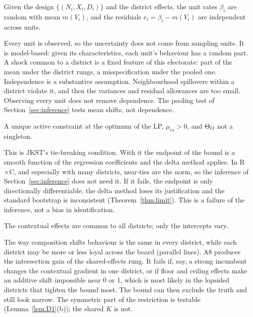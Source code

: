 \begin{assumption}\label{ass:A6}
Given the design $\{(N_i,X_i,D_i)\}$ and the district effects, the unit rates
$\beta_i$ are random with mean $m(V_i)$, and the residuals $e_i=\beta_i-m(V_i)$ are
independent across units.
\end{assumption}
\begin{reading}
Every unit is observed, so the uncertainty does not come from sampling units. It
is model-based: given its characteristics, each unit's behaviour has a random
part. A shock common to a district is a fixed feature of this electorate: part
of the mean under the district rungs, a misspecification under the pooled one.
Independence is a substantive assumption. Neighbourhood spillovers within a
district violate it, and then the variances and residual allowances are too
small. Observing every unit does not remove dependence. The pooling test of
Section~\ref{sec:inference} tests mean shifts, not dependence.
\end{reading}

\begin{assumption}\label{ass:A7}
A unique active constraint at the optimum of the LP, $\mu_{rs}>0$, and $\Theta_O$ not
a singleton.
\end{assumption}
\begin{reading}
This is JKST's tie-breaking condition. With it the endpoint of the bound is a
smooth function of the regression coefficients and the delta method applies.
In R$\times$C, and especially with many districts, near-ties are the norm, so the
inference of Section~\ref{sec:inference} does not need it. If it fails, the endpoint
is only directionally differentiable, the delta method loses its justification
and the standard bootstrap is inconsistent (Theorem~\ref{thm:limit}). This is a
failure of the inference, not a bias in identification.
\end{reading}

\begin{assumption}\label{ass:A8}
The contextual effects are common to all districts; only the intercepts vary.
\end{assumption}
\begin{reading}
The way composition shifts behaviour is the same in every district, while each
district may be more or less loyal across the board (parallel lines). A8
produces the intersection gain of the shared-effects rung. It fails if, say, a
strong incumbent changes the contextual gradient in one district, or if floor
and ceiling effects make an additive shift impossible near 0 or 1, which is most
likely in the lopsided districts that tighten the bound most. The bound can then
exclude the truth and still look narrow. The symmetric part of the restriction
is testable (Lemma~\ref{lem:D1}(b)); the shared $K$ is not.
\end{reading}


